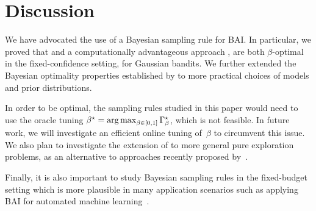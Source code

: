 \section{Discussion}\label{sec:t3c.discussion}

We have advocated the use of a Bayesian sampling rule for BAI. In particular, we proved that \TTTS and a computationally advantageous approach \TCC, are both $\beta$-optimal in the fixed-confidence setting, for Gaussian bandits. 
We further extended the Bayesian optimality properties established by \cite{russo2016ttts} to more practical choices of models and prior distributions. 


In order to be optimal, the sampling rules studied in this paper would need to use the oracle tuning $\beta^\star =\operatorname*{arg\,max}_{\beta \in [0,1]} \Gamma_\beta^\star$, which is not feasible. In future work, we will investigate an efficient online tuning of~$\beta$ to circumvent this issue. We also plan to investigate the extension of \TCC to more general pure exploration problems, as an alternative to approaches recently proposed by~\citet{menard2019lma,degenne2019game}.

Finally, it is also important to study Bayesian sampling rules in the fixed-budget setting which is more plausible in many application scenarios such as applying BAI for automated machine learning~\citep{hoffman2014bayesgap,li2017hyperband,shang2019dttts}.
\vfil
